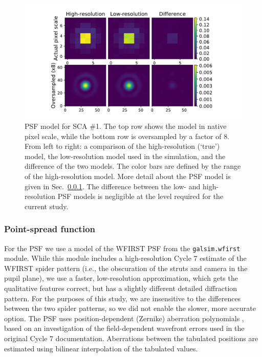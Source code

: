 \documentclass[usenatbib]{mnras}
\begin{document}
\begin{figure}
\begin{center}
\includegraphics[width=\columnwidth]{figures/psf.pdf}
\end{center}
\caption[]{
PSF model for SCA \#1. The top row shows the model in native pixel scale, while the bottom row is oversampled by a factor of 8. From left to right: a comparison of the high-resolution (`true') model, the low-resolution model used in the simulation, and the difference of the two models. The color bars are defined by the range of the high-resolution model. More detail about the PSF model is given in Sec.~\ref{psf}. The difference between the low- and high-resolution PSF models is negligible at the level required for the current study.
\label{fig:psf}}
\end{figure}

\subsubsection{Point-spread function}\label{psf}

For the PSF we use a model of the WFIRST PSF from the \texttt{galsim.wfirst} module.
While this module includes a high-resolution Cycle 7 estimate of the WFIRST spider pattern (i.e., the obscuration of the struts and camera in the pupil plane), we use a faster, low-resolution approximation, which gets the qualitative features correct, but has a slightly different detailed diffraction pattern.  
For the purposes of this study, we are insensitive to the differences between the two spider patterns, so we did not enable the slower, more accurate option.
The PSF uses position-dependent (Zernike) aberration polynomials \citep{noll1976}, based on an investigation of the field-dependent wavefront errors used in the original Cycle 7 documentation.
Aberrations between the tabulated positions are estimated using bilinear interpolation of the tabulated values.
\end{document}
